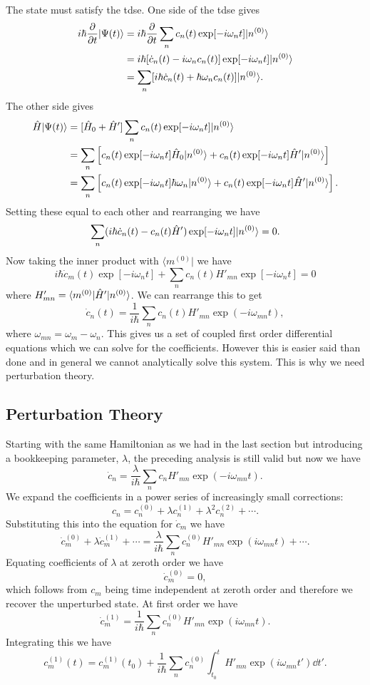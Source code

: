 \documentclass[a4paper]{article}
\renewcommand{\ket}[1]{\vert {#1} \rangle}
\renewcommand{\bra}[1]{\langle {#1} \vert}
\begin{document}
    The state must satisfy the \gls{tdse}.
    One side of the \gls{tdse} gives
    \begin{align*}
        i\hbar \pdv{t}\ket{\Psi(t)} &= i\hbar\pdv{t} \sum_n c_n(t) \exp[-i\omega_n t]\ket{n^{(0)}}\\
        &= i\hbar [\dot{c}_n(t) - i\omega_n c_n(t)]\exp[-i\omega_nt]\ket{n^{(0)}}\\
        &= \sum_{n} [i\hbar\dot{c}_n(t) + \hbar\omega_nc_n(t)]\ket{n^{(0)}}.
    \end{align*}
    The other side gives
    \begin{align*}
        \operator{H}\ket{\Psi(t)} &= [\operator{H}_0 + \operator{H}']\sum_n c_n(t) \exp[-i\omega_n t]\ket{n^{(0)}}\\
        &= \sum_n \left[  c_n(t) \exp[-i\omega_n t]\operator{H}_0\ket{n^{(0)}} + c_n(t) \exp[-i\omega_n t]\operator{H}'\ket{n^{(0)}}\right]\\
        &= \sum_n \left[  c_n(t) \exp[-i\omega_n t]\hbar\omega_n\ket{n^{(0)}} + c_n(t) \exp[-i\omega_n t]\operator{H}'\ket{n^{(0)}}\right].\\
    \end{align*}
    Setting these equal to each other and rearranging we have
    \[\sum_{n} (i\hbar\dot{c}_n(t) - c_n(t)\operator{H}')\exp[-i\omega_nt]\ket{n^{(0)}} = 0.\]
    Now taking the inner product with \(\bra{m^{(0)}}\) we have
    \[i\hbar\dot{c}_m(t)\exp[-i\omega_nt] + \sum_n c_n(t)H'_{mn}\exp[-i\omega_nt] = 0\]
    where \(H'_{mn} = \bra{m^{(0)}}\operator{H}'\ket{n^{(0)}}\).
    We can rearrange this to get
    \[\dot{c}_n(t) = \frac{1}{i\hbar} \sum_n c_n(t)H'_{mn}\exp(-i\omega_{mn}t),\]
    where \(\omega_{mn} = \omega_m - \omega_n\).
    This gives us a set of coupled first order differential equations which we can solve for the coefficients.
    However this is easier said than done and in general we cannot analytically solve this system.
    This is why we need perturbation theory.
    
    \subsection{Perturbation Theory}
    Starting with the same Hamiltonian as we had in the last section but introducing a bookkeeping parameter, \(\lambda\), the preceding analysis is still valid but now we have
    \[\dot{c}_n = \frac{\lambda}{i\hbar}\sum_n c_n H'_{mn}\exp(-i\omega_{mn}t).\]
    We expand the coefficients in a power series of increasingly small corrections:
    \[c_n = c_n^{(0)} + \lambda c_n^{(1)} + \lambda^2 c_n^{(2)} + \dotsb.\]
    Substituting this into the equation for \(\dot{c}_m\) we have
    \[\dot{c}_m^{(0)} + \lambda\dot{c}_m^{(1)} + \dotsb = \frac{\lambda}{i\hbar} \sum_n c_n^{(0)}H'_{mn}\exp(i\omega_{mn}t) + \dotsb.\]
    Equating coefficients of \(\lambda\) at zeroth order we have
    \[\dot{c}_m^{(0)} = 0,\]
    which follows from \(c_m\) being time independent at zeroth order and therefore we recover the unperturbed state.
    At first order we have
    \[\dot{c}_m^{(1)} = \frac{1}{i\hbar}\sum_n c_n^{(0)}H'_{mn}\exp(i\omega_{mn}t).\]
    Integrating this we have
    \[c_m^{(1)}(t) = c_m^{(1)}(t_0) + \frac{1}{i\hbar} \sum_n c_n^{(0)}\int_{t_0}^{t} H'_{mn}\exp(i\omega_{mn}t')\dd{t'}.\]
    
\end{document}
